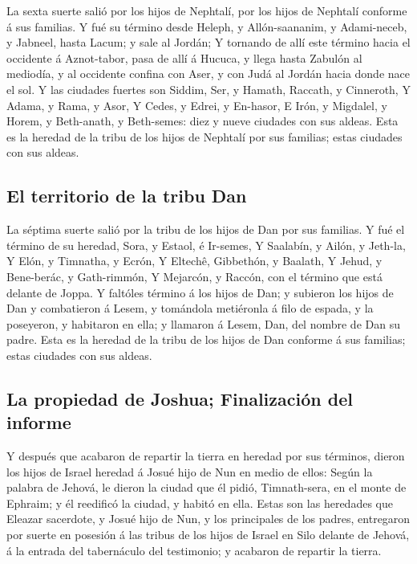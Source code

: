  La sexta suerte salió por los hijos de Nephtalí, por los
hijos de Nephtalí conforme á sus familias.  Y fué su
término desde Heleph, y Allón-saananim, y Adami-neceb, y Jabneel, hasta
Lacum; y sale al Jordán;  Y tornando de allí este término
hacia el occidente á Aznot-tabor, pasa de allí á Hucuca, y llega hasta
Zabulón al mediodía, y al occidente confina con Aser, y con Judá al
Jordán hacia donde nace el sol.  Y las ciudades fuertes
son Siddim, Ser, y Hamath, Raccath, y Cinneroth,  Y
Adama, y Rama, y Asor,  Y Cedes, y Edrei, y En-hasor,
 E Irón, y Migdalel, y Horem, y Beth-anath, y Beth-semes:
diez y nueve ciudades con sus aldeas.  Esta es la heredad
de la tribu de los hijos de Nephtalí por sus familias; estas ciudades
con sus aldeas.

\hypertarget{el-territorio-de-la-tribu-dan}{%
\subsection{El territorio de la tribu
Dan}\label{el-territorio-de-la-tribu-dan}}

 La séptima suerte salió por la tribu de los hijos de Dan
por sus familias.  Y fué el término de su heredad, Sora,
y Estaol, é Ir-semes,  Y Saalabín, y Ailón, y Jeth-la,
 Y Elón, y Timnatha, y Ecrón,  Y Eltechê,
Gibbethón, y Baalath,  Y Jehud, y Bene-berác, y
Gath-rimmón,  Y Mejarcón, y Raccón, con el término que
está delante de Joppa.  Y faltóles término á los hijos de
Dan; y subieron los hijos de Dan y combatieron á Lesem, y tomándola
metiéronla á filo de espada, y la poseyeron, y habitaron en ella; y
llamaron á Lesem, Dan, del nombre de Dan su padre.  Esta
es la heredad de la tribu de los hijos de Dan conforme á sus familias;
estas ciudades con sus aldeas.

\hypertarget{la-propiedad-de-joshua-finalizaciuxf3n-del-informe}{%
\subsection{La propiedad de Joshua; Finalización del
informe}\label{la-propiedad-de-joshua-finalizaciuxf3n-del-informe}}

 Y después que acabaron de repartir la tierra en heredad
por sus términos, dieron los hijos de Israel heredad á Josué hijo de Nun
en medio de ellos:  Según la palabra de Jehová, le dieron
la ciudad que él pidió, Timnath-sera, en el monte de Ephraim; y él
reedificó la ciudad, y habitó en ella.  Estas son las
heredades que Eleazar sacerdote, y Josué hijo de Nun, y los principales
de los padres, entregaron por suerte en posesión á las tribus de los
hijos de Israel en Silo delante de Jehová, á la entrada del tabernáculo
del testimonio; y acabaron de repartir la tierra.

